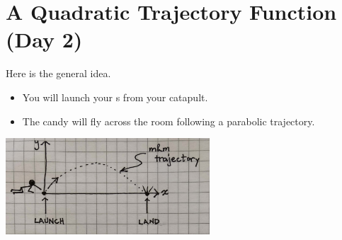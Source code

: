 \section{A Quadratic Trajectory Function (Day 2)}


Here is the general idea.
\begin{itemize}[nosep]
    \item You will launch your \mymm{}s from your catapult.
    \item The candy will fly across the room following a parabolic trajectory.
\end{itemize}

\begin{center}
\includegraphics[width=3in]{../launch-and-landing.jpg}
\end{center}